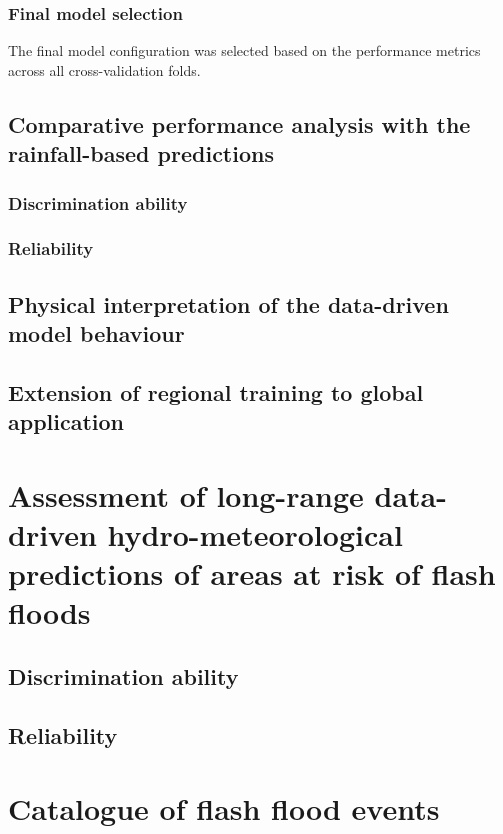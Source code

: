 \subsubsection{Final model selection}

The final model configuration was selected based on the performance metrics across all cross-validation folds. 















\subsection{Comparative performance analysis with the rainfall-based predictions}
\subsubsection{Discrimination ability}
\subsubsection{Reliability}

\subsection{Physical interpretation of the data-driven model behaviour}

\subsection{Extension of regional training to global application}


\section{Assessment of long-range data-driven hydro-meteorological predictions of areas at risk of flash floods}
\label{verif_data_driven_long_fc}

\subsection{Discrimination ability}

\subsection{Reliability}


\section{Catalogue of flash flood events}
\label{verif_case_study}